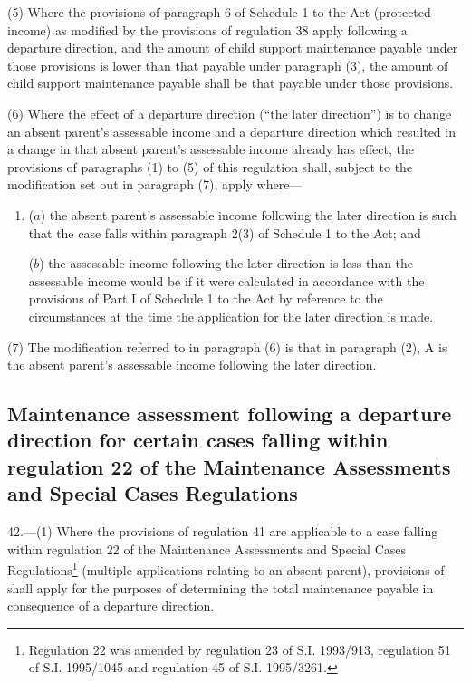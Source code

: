 \documentclass[a4paper]{article}
\begin{document}
(5) Where the provisions of paragraph 6 of Schedule 1 to the Act (protected income) as modified by the provisions of regulation 38 apply following a departure direction, and the amount of child support maintenance payable under those provisions is lower than that payable under paragraph (3), the amount of child support maintenance payable shall be that payable under those provisions.

(6) Where the effect of a departure direction (“the later direction”) is to change an absent parent’s assessable income and a departure direction which resulted in a change in that absent parent’s assessable income already has effect, the provisions of paragraphs (1) to (5) of this regulation shall, subject to the modification set out in paragraph (7), apply where—
\begin{enumerate}\item[]
($a$) the absent parent’s assessable income following the later direction is such that the case falls within paragraph 2(3) of Schedule 1 to the Act; and

($b$) the assessable income following the later direction is less than the assessable income would be if it were calculated in accordance with the provisions of Part I of Schedule 1 to the Act by reference to the circumstances at the time the application for the later direction is made.
\end{enumerate}

(7) The modification referred to in paragraph (6) is that in paragraph (2), A is the absent parent’s assessable income following the later direction.

\subsection[42. Maintenance assessment following a departure direction for certain cases falling within regulation 22 of the Maintenance Assessments and Special Cases Regulations]{Maintenance assessment following a departure direction for certain cases falling within regulation 22 of the Maintenance Assessments and Special Cases Regulations}

42.—(1) Where the provisions of regulation 41 are applicable to a case falling within regulation 22 of the Maintenance Assessments and Special Cases Regulations\footnote{\frenchspacing Regulation 22 was amended by regulation 23 of S.I. 1993/913, regulation 51 of S.I. 1995/1045 and regulation 45 of S.I. 1995/3261.} (multiple applications relating to an absent parent), provisions of shall apply for the purposes of determining the total maintenance payable in consequence of a departure direction.
\end{document}
